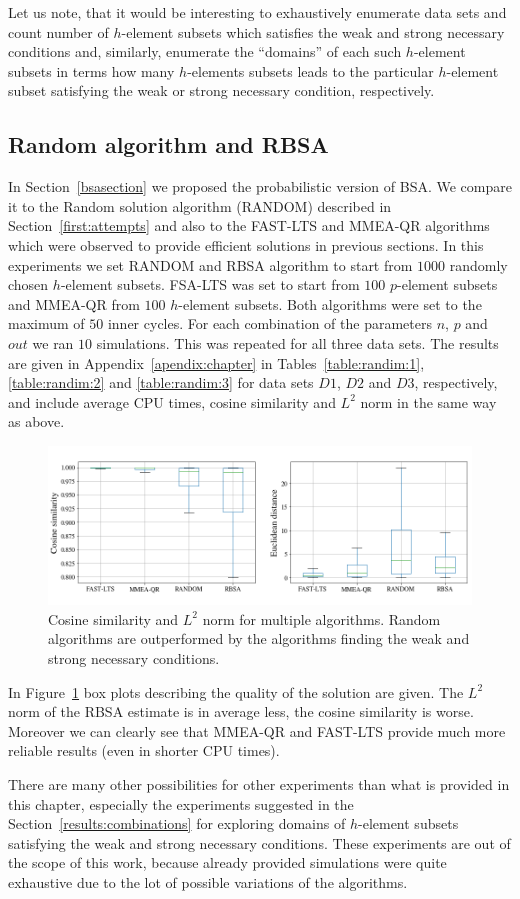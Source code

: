Let us note, that it would be interesting to exhaustively enumerate data sets and count number of $h$-element subsets which satisfies the weak and strong necessary conditions and, similarly, enumerate the ``domains'' of each such $h$-element subsets in terms how many $h$-elements subsets leads to the particular $h$-element subset satisfying the weak or strong necessary condition, respectively.


\subsection{Random algorithm and RBSA}
In Section~\ref{bsasection} we proposed the probabilistic version of BSA. We compare it to the Random solution algorithm (RANDOM) described in Section~\ref{first:attempts} and also to the FAST-LTS and MMEA-QR algorithms which were observed to provide efficient solutions in previous sections. In this experiments we set RANDOM and RBSA algorithm to start from $1000$ randomly chosen $h$-element subsets. FSA-LTS was set to start from $100$ $p$-element subsets and MMEA-QR from $100$ $h$-element subsets. Both algorithms were set to the maximum of $50$ inner cycles. For each combination of the parameters $n$, $p$ and $out$ we ran $10$ simulations. This was repeated for all three data sets. The results are given in Appendix~\ref{apendix:chapter} in Tables~\ref{table:randim:1}, \ref{table:randim:2} and \ref{table:randim:3} for data sets $D1$, $D2$ and $D3$, respectively, and include average CPU times, cosine similarity and $L^2$ norm in the same way as above.

\begin{figure}[h]
    \centering
    \includegraphics[width=12cm]{img/random_box}

    \caption{Cosine similarity and $L^2$ norm for multiple algorithms. Random algorithms are outperformed by the algorithms finding the weak and strong necessary conditions.}
    \label{randim:box}
\end{figure}

In Figure~\ref{randim:box} box plots describing the quality of the solution are given. The $L^2$ norm of the RBSA estimate is in average less, the cosine similarity is worse. Moreover we can clearly see that MMEA-QR and FAST-LTS provide much more reliable results (even in shorter CPU times).

There are many other possibilities for other experiments than what is provided in this chapter, especially the experiments suggested in the Section~\ref{results:combinations} for exploring domains of $h$-element subsets satisfying the weak and strong necessary conditions. These experiments are out of the scope of this work, because already provided simulations were quite exhaustive due to the lot of possible variations of the algorithms.  